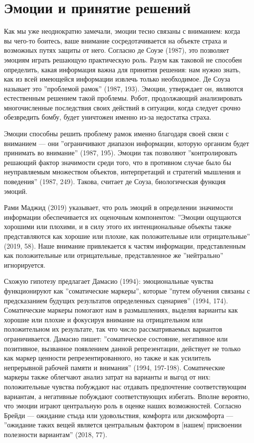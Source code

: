 \documentclass[11pt]{book}
\begin{document}
\section{Эмоции и принятие решений}

Как мы уже неоднократно замечали, эмоции тесно связаны с вниманием: когда вы чего-то боитесь, ваше внимание сосредотачивается на объекте страха и возможных путях защиты от него. Согласно де Соузе (1987), это позволяет эмоциям играть решающую практическую роль. Разум как таковой не способен определить, какая информация важна для принятия решения: нам нужно знать, как из всей имеющейся информации извлечь только необходимое. Де Соуза называет это ''проблемой рамок'' (1987, 193). Эмоции, утверждает он, являются естественным решением такой проблемы. Робот, продолжающий анализировать многочисленные последствия своих действий в ситуации, когда следует срочно обезвредить бомбу, будет уничтожен именно из-за недостатка страха.

Эмоции способны решить проблему рамок именно благодаря своей связи с вниманием --- они ''ограничивают диапазон информации, которую организм будет принимать во внимание'' (1987, 195). Эмоции так позволяют ''контролировать решающий фактор значимости среди того, что в противном случае было бы неуправляемым множеством объектов, интерпретаций и стратегий мышления и поведения'' (1987, 249). Такова, считает де Соуза, биологическая функция эмоций.

Рами Маджид (2019) указывает, что роль эмоций в определении значимости информации обеспечивается их оценочным компонентом: ''Эмоции ощущаются хорошими или плохими, и в силу этого их интенциональные объекты также представляются как хорошие или плохие, как положительные или отрицательные'' (2019, 58). Наше внимание привлекается к частям информации, представленным как положительные или отрицательные, представленное же ''нейтрально'' игнорируется.

Схожую гипотезу предлагает Дамасио (1994): эмоциональные чувства функционируют как ''соматические маркеры'', которые ''путем обучения связаны с предсказанием будущих результатов определенных сценариев'' (1994, 174). Соматические маркеры помогают нам в размышлениях, выделяя варианты как хорошие или плохие и фокусируя внимание на отрицательном или положительном их результате, так что число рассматриваемых вариантов ограничивается. Дамасио пишет: ''соматическое состояние, негативное или позитивное, вызванное появлением данной репрезентации, действует не только как маркер ценности репрезентированного, но также и как усилитель непрерывной рабочей памяти и внимания'' (1994, 197-198). Соматические маркеры также облегчают анализ затрат на варианты и выгод от них: положительные чувства побуждают нас отдавать предпочтение соответствующим вариантам, а негативные побуждают соответствующих избегать. Вполне вероятно, что эмоции играют центральную роль в оценке наших возможностей. Согласно Брейди --- ожидание стыда или удовольствия, комфорта или дискомфорта --- ''ожидание таких вещей является центральным фактором в [нашем] присвоении полезности вариантам'' (2018, 77).
\end{document}
